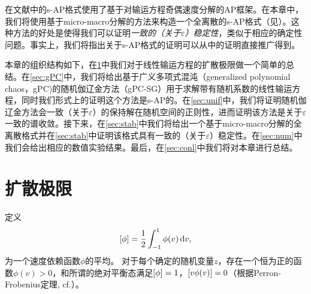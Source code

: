 在文献中的s-AP格式使用了基于对输运方程奇偶速度分解的AP框架。在本章中，我们将使用基于micro-macro分解的方法来构造一个全离散的s-AP格式（见）。这种方法的好处是使得我们可以证明{\it 一致的（关于$\varepsilon$）稳定性}，类似于相应的确定性问题。事实上，我们将指出关于s-AP格式的证明可以从中的证明直接推广得到。

本章的组织结构如下，在\ref{sec:scheme}中我们对于线性输运方程的扩散极限做一个简单的总结。在\ref{sec:gPC}中，我们将给出基于广义多项式混沌（generalized polynomial chaos，gPC)的随机伽辽金方法（gPC-SG）用于求解带有随机系数的线性输运方程，同时我们形式上的证明这个方法是s-AP的。在\ref{sec:unif}中，我们将证明随机伽辽金方法会一致（关于$\varepsilon$）的保持解在随机空间的正则性，进而证明该方法是关于$\varepsilon$一致的谱收敛。接下来，在\ref{sec:stab}中我们将给出一个基于micro-macro分解的全离散格式并在\ref{sec:stab}中证明该格式具有一致的（关于$\varepsilon$）稳定性。在\ref{sec:num}中我们会给出相应的数值实验结果。最后，在\ref{sec:conl}中我们将对本章进行总结。




\section{扩散极限}\label{sec:scheme}

定义
\begin{equation}\label{ave}
  \left[ \phi \right]=\frac{1}{2}\int_{-1}^1\phi(v)\mathop{}\!\mathrm{d} v,
\end{equation}
为一个速度依赖函数$\phi$的平均。 对于每个确定的随机变量$z$，存在一个恒为正的函数$\phi(v)>0$，和所谓的绝对平衡态满足$\left[ \phi \right]=1$，$\left[ v\phi(v) \right]=0$（根据Perron-Frobenius定理, cf.）。

